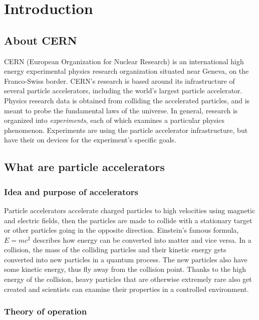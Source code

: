 \documentclass[12pt]{article}
\begin{document}
\section{Introduction}\label{sec_intro}

\subsection{About CERN}\label{sec_about_cern}

CERN (European Organization for Nuclear Research) is an international high energy experimental physics research organization situated near Geneva, on the Franco-Swiss border. CERN's research is based around its infrastructure of several particle accelerators, including the world's largest particle accelerator. Physics research data is obtained from colliding the accelerated particles, and is meant to probe the fundamental laws of the universe. In general, research is organized into \textit{experiments}, each of which examines a particular physics phenomenon. Experiments are using the particle accelerator infrastructure, but have their on devices for the experiment's specific goals.
\cite{cern_about}


\subsection{What are particle accelerators}\label{sec_part_accel_intro}

\subsubsection{Idea and purpose of accelerators}\label{sec_part_accel_idea}

Particle accelerators accelerate charged particles to high velocities using magnetic and electric fields, then the particles are made to collide with a stationary target or other particles going in the opposite direction. Einstein's famous formula, $E=mc^2$ describes how energy can be converted into matter and vice versa. In a collision, the mass of the colliding particles and their kinetic energy gets converted into new particles in a quantum process. The new particles also have some kinetic energy, thus fly away from the collision point. Thanks to the high energy of the collision, heavy particles that are otherwise extremely rare also get created and scientists can examine their properties in a controlled environment.

\subsubsection{Theory of operation}\label{sec_part_accel_theory}
\end{document}
